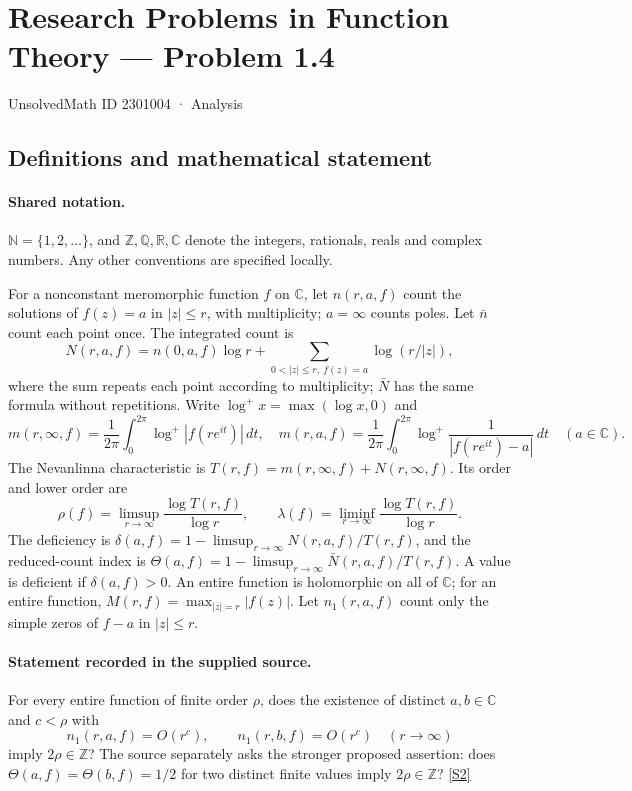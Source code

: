 \documentclass[11pt]{article}
\newcommand{\sref}[2]{\hyperlink{source:#1:#2}{[S#2]}}
\begin{document}
\setcounter{section}{2301003}
\section{Research Problems in Function Theory — Problem 1.4}\label{2301004}
{\small\sffamily UnsolvedMath ID 2301004 · Analysis}
\subsection{Definitions and mathematical statement}

\paragraph{Shared notation.}$\mathbb N=\{1,2,\ldots\}$, and $\mathbb Z,\mathbb Q,\mathbb R,\mathbb C$ denote the integers, rationals, reals and complex numbers. Any other conventions are specified locally.


For a nonconstant meromorphic function $f$ on $\mathbb C$, let $n(r,a,f)$ count the solutions of $f(z)=a$ in $|z|\le r$, with multiplicity; $a=\infty$ counts poles. Let $\bar n$ count each point once. The integrated count is
\[
 N(r,a,f)=n(0,a,f)\log r+\sum_{0<|z|\le r,\ f(z)=a}\log(r/|z|),
\]
where the sum repeats each point according to multiplicity; $\bar N$ has the same formula without repetitions. Write $\log^+x=\max(\log x,0)$ and
\[
 m(r,\infty,f)=\frac1{2\pi}\int_0^{2\pi}\log^+|f(re^{it})|\,dt,\quad
 m(r,a,f)=\frac1{2\pi}\int_0^{2\pi}\log^+\frac1{|f(re^{it})-a|}\,dt\quad(a\in\mathbb C).
\]
The Nevanlinna characteristic is $T(r,f)=m(r,\infty,f)+N(r,\infty,f)$. Its order and lower order are
\[
 \rho(f)=\limsup_{r\to\infty}\frac{\log T(r,f)}{\log r},\qquad
 \lambda(f)=\liminf_{r\to\infty}\frac{\log T(r,f)}{\log r}.
\]
The deficiency is $\delta(a,f)=1-\limsup_{r\to\infty}N(r,a,f)/T(r,f)$, and the reduced-count index is $\Theta(a,f)=1-\limsup_{r\to\infty}\bar N(r,a,f)/T(r,f)$. A value is deficient if $\delta(a,f)>0$. An entire function is holomorphic on all of $\mathbb C$; for an entire function, $M(r,f)=\max_{|z|=r}|f(z)|$. Let $n_1(r,a,f)$ count only the simple zeros of $f-a$ in $|z|\le r$.
\paragraph{Statement recorded in the supplied source.}
For every entire function of finite order $\rho$, does the existence of distinct $a,b\in\mathbb C$ and $c<\rho$ with
\[
 n_1(r,a,f)=O(r^c),\qquad n_1(r,b,f)=O(r^c)\quad(r\to\infty)
\]
imply $2\rho\in\mathbb Z$? The source separately asks the stronger proposed assertion: does $\Theta(a,f)=\Theta(b,f)=1/2$ for two distinct finite values imply $2\rho\in\mathbb Z$? \sref{2301004}{2}
\end{document}
